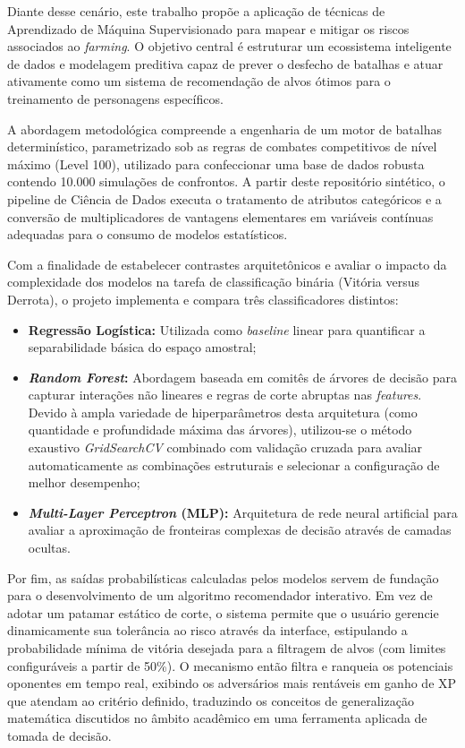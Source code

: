 \documentclass[12pt, a4paper]{article}
\begin{document}
Diante desse cenário, este trabalho propõe a aplicação de técnicas de Aprendizado de Máquina Supervisionado para mapear e mitigar os riscos associados ao \textit{farming}. O objetivo central é estruturar um ecossistema inteligente de dados e modelagem preditiva capaz de prever o desfecho de batalhas e atuar ativamente como um sistema de recomendação de alvos ótimos para o treinamento de personagens específicos.

A abordagem metodológica compreende a engenharia de um motor de batalhas determinístico, parametrizado sob as regras de combates competitivos de nível máximo (Level 100), utilizado para confeccionar uma base de dados robusta contendo 10.000 simulações de confrontos. A partir deste repositório sintético, o pipeline de Ciência de Dados executa o tratamento de atributos categóricos e a conversão de multiplicadores de vantagens elementares em variáveis contínuas adequadas para o consumo de modelos estatísticos.

Com a finalidade de estabelecer contrastes arquitetônicos e avaliar o impacto da complexidade dos modelos na tarefa de classificação binária (Vitória versus Derrota), o projeto implementa e compara três classificadores distintos:
\begin{itemize}
    \item \textbf{Regressão Logística:} Utilizada como \textit{baseline} linear para quantificar a separabilidade básica do espaço amostral;
    \item \textbf{\textit{Random Forest}:} Abordagem baseada em comitês de árvores de decisão para capturar interações não lineares e regras de corte abruptas nas \textit{features}. Devido à ampla variedade de hiperparâmetros desta arquitetura (como quantidade e profundidade máxima das árvores), utilizou-se o método exaustivo \textit{GridSearchCV} combinado com validação cruzada para avaliar automaticamente as combinações estruturais e selecionar a configuração de melhor desempenho;
    \item \textbf{\textit{Multi-Layer Perceptron} (MLP):} Arquitetura de rede neural artificial para avaliar a aproximação de fronteiras complexas de decisão através de camadas ocultas.
\end{itemize}

Por fim, as saídas probabilísticas calculadas pelos modelos servem de fundação para o desenvolvimento de um algoritmo recomendador interativo. Em vez de adotar um patamar estático de corte, o sistema permite que o usuário gerencie dinamicamente sua tolerância ao risco através da interface, estipulando a probabilidade mínima de vitória desejada para a filtragem de alvos (com limites configuráveis a partir de 50\%). O mecanismo então filtra e ranqueia os potenciais oponentes em tempo real, exibindo os adversários mais rentáveis em ganho de XP que atendam ao critério definido, traduzindo os conceitos de generalização matemática discutidos no âmbito acadêmico em uma ferramenta aplicada de tomada de decisão.
\end{document}
